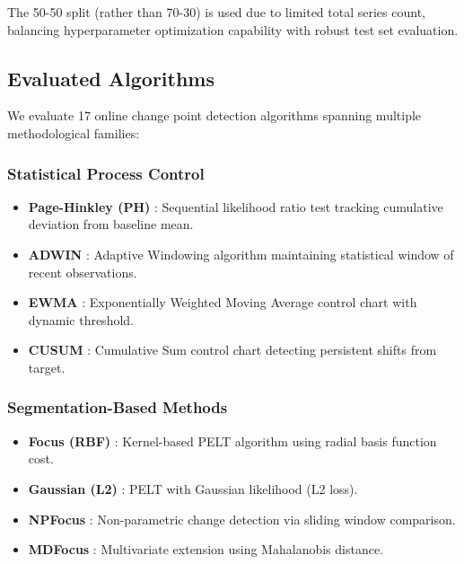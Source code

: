 \documentclass[journal,article,submit,pdftex,moreauthors]{Definitions/mdpi}
\begin{document}
The 50-50 split (rather than 70-30) is used due to limited total series count, balancing hyperparameter optimization capability with robust test set evaluation.

\subsection{Evaluated Algorithms}
\label{sec:algorithms}

We evaluate 17 online change point detection algorithms spanning multiple methodological families:

\subsubsection{Statistical Process Control}

\begin{itemize}
    \item \textbf{Page-Hinkley (PH)} \cite{page1954continuous}: Sequential likelihood ratio test tracking cumulative deviation from baseline mean.
    
    \item \textbf{ADWIN} \cite{bifet2007learning}: Adaptive Windowing algorithm maintaining statistical window of recent observations.
    
    \item \textbf{EWMA} \cite{roberts1959control}: Exponentially Weighted Moving Average control chart with dynamic threshold.
    
    \item \textbf{CUSUM} \cite{page1954continuous}: Cumulative Sum control chart detecting persistent shifts from target.
\end{itemize}

\subsubsection{Segmentation-Based Methods}

\begin{itemize}
    \item \textbf{Focus (RBF)} \cite{truong2020selective}: Kernel-based PELT algorithm using radial basis function cost.
    
    \item \textbf{Gaussian (L2)} \cite{truong2020selective}: PELT with Gaussian likelihood (L2 loss).
    
    \item \textbf{NPFocus} \cite{truong2020selective}: Non-parametric change detection via sliding window comparison.
    
    \item \textbf{MDFocus} \cite{truong2020selective}: Multivariate extension using Mahalanobis distance.
\end{itemize}
\end{document}
